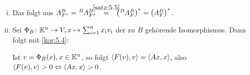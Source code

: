 \begin{beweis}
	\mbox{} \\[-0.9cm]
	\begin{enumerate}[(i)]
		\item Das folgt aus $A^B_{F^*} = \mat{A}{B}{B}{F^*} \stack{\ref{satz:5.5}}{=} \enb{\mat{A}{B}{B}{F}}^* = \enb{A^B_F}^*$.
		\item Sei $\Phi_B\colon \mathbb{K}^n \rightarrow V, x \mapsto \sum_{i=1}^{n} x_i v_i$ der zu $B$ gehörende Isomorphismus.
		Dann folgt mit \autoref{kor:5.4}:
		
		Ist $v = \Phi_B(x), x \in \mathbb{K}^n$, so folgt $\left\langle F(v),v\right\rangle = \left\langle Ax,x\right\rangle$, also $\left\langle F(v),v\right\rangle > 0 \Leftrightarrow \left\langle Ax,x\right\rangle > 0$. \qedhere
	\end{enumerate}
\end{beweis}